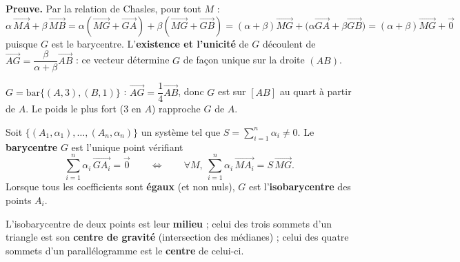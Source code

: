 \begin{remarque}
\textbf{Preuve.} Par la relation de Chasles, pour tout $M$ :
$\alpha\,\overrightarrow{MA}+\beta\,\overrightarrow{MB}
=\alpha(\overrightarrow{MG}+\overrightarrow{GA})+\beta(\overrightarrow{MG}+\overrightarrow{GB})
=(\alpha+\beta)\overrightarrow{MG}+\big(\alpha\overrightarrow{GA}+\beta\overrightarrow{GB}\big)
=(\alpha+\beta)\overrightarrow{MG}+\vec0$
puisque $G$ est le barycentre. L'\textbf{existence et l'unicité} de $G$ découlent de
$\overrightarrow{AG}=\dfrac{\beta}{\alpha+\beta}\overrightarrow{AB}$ : ce vecteur détermine
$G$ de façon unique sur la droite $(AB)$.
\end{remarque}

\begin{exemple}
$G=\mathrm{bar}\{(A,3),(B,1)\}$ : $\overrightarrow{AG}=\dfrac{1}{4}\overrightarrow{AB}$, donc
$G$ est sur $[AB]$ au quart à partir de $A$. Le poids le plus fort ($3$ en $A$) rapproche $G$ de $A$.
\end{exemple}

\begin{definition}
Soit $\{(A_1,\alpha_1),\dots,(A_n,\alpha_n)\}$ un système tel que $S=\displaystyle\sum_{i=1}^{n}\alpha_i\neq0$. Le \textbf{barycentre} $G$ est l'unique point vérifiant
\[
\sum_{i=1}^{n}\alpha_i\,\overrightarrow{GA_i}=\vec 0
\qquad\Longleftrightarrow\qquad
\forall M,\ \sum_{i=1}^{n}\alpha_i\,\overrightarrow{MA_i}=S\,\overrightarrow{MG}.
\]
Lorsque tous les coefficients sont \textbf{égaux} (et non nuls), $G$ est l'\textbf{isobarycentre} des points $A_i$.
\end{definition}

\begin{remarque}
L'isobarycentre de deux points est leur \textbf{milieu} ; celui des trois sommets d'un triangle est son \textbf{centre de gravité} (intersection des médianes) ; celui des quatre sommets d'un parallélogramme est le \textbf{centre} de celui-ci.
\end{remarque}

\begin{illus}
\end{illus}

